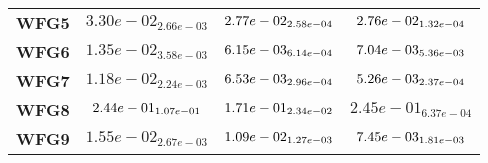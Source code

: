 \documentclass{article}
\begin{document}
\begin{table}[!htp]
\begin{scriptsize}
\begin{tabular}{c|ccc}
      \textbf{WFG5} & $3.30e-02_{2.66e-03} $ & $ \cellcolor{gray25} 2.77e-02_{2.58e-04} $ & $ \cellcolor{gray95} 2.76e-02_{1.32e-04}$ \\
      \textbf{WFG6} & $1.35e-02_{3.58e-03} $ & $ \cellcolor{gray95} 6.15e-03_{6.14e-04} $ & $ \cellcolor{gray25} 7.04e-03_{5.36e-03}$ \\
      \textbf{WFG7} & $1.18e-02_{2.24e-03} $ & $ \cellcolor{gray25} 6.53e-03_{2.96e-04} $ & $ \cellcolor{gray95} 5.26e-03_{2.37e-04}$ \\
      \textbf{WFG8} & $\cellcolor{gray25} 2.44e-01_{1.07e-01} $ & $ \cellcolor{gray95} 1.71e-01_{2.34e-02} $ & $ 2.45e-01_{6.37e-04}$ \\
      \textbf{WFG9} & $1.55e-02_{2.67e-03} $ & $ \cellcolor{gray25} 1.09e-02_{1.27e-03} $ & $ \cellcolor{gray95} 7.45e-03_{1.81e-03}$ \\
  \end{tabular}
  \end{scriptsize}
\end{table}
\end{document}
